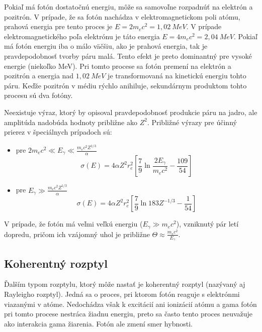 \documentclass[../../main.tex]{subfiles}
\begin{document}
Pokiaľ má fotón dostatočnú energiu, môže sa samovoľne rozpadnúť na elektrón a pozitrón. V prípade, že sa fotón nachádza v elektromagnetickom poli atómu, prahová energia pre tento proces je $E=2m_ec^2=1,02\:\unit{MeV}$. V prípade elektromagnetického poľa elektrónu je táto energia $E=4m_ec^2=2,04\:\unit{MeV}$. Pokiaľ má fotón energiu iba o málo väčšiu, ako je prahová energia, tak je pravdepodobnosť tvorby páru malá. Tento efekt je preto dominantný pre vysoké energie (niekoľko MeV). Pri tomto procese sa fotón premení na elektrón a pozitrón a energia nad $1,02\:\unit{MeV}$ je transformovaná na kinetickú energiu tohto páru. Keďže pozitrón v médiu rýchlo anihiluje, sekundárnym produktom tohto procesu sú dva fotóny.

Neexistuje výraz, ktorý by opisoval pravdepodobnosť produkcie páru na jadro, ale amplitúda nadobúda hodnoty približne ako $Z^2$. Približné výrazy pre účinný prierez v špeciálnych prípadoch sú:
\begin{itemize}
\item pre $2m_ec^2\ll E_\gamma \ll \frac{m_ec^2Z^{1/3}}{\alpha}$
\begin{equation}
\sigma(E)=4\alpha Z^2r_e^2\left[\dfrac{7}{9}\ln\dfrac{2E_\gamma}{m_ec^2}-\dfrac{109}{54}\right]
\end{equation}
\item pre $E_\gamma \gg \frac{m_ec^2Z^{1/3}}{\alpha}$
\begin{equation}
\sigma(E)=4\alpha Z^2r_e^2\left[\dfrac{7}{9}\ln183Z^{-1/3}-\dfrac{1}{54}\right]
\end{equation}
\end{itemize}
V prípade, že fotón má veľmi veľkú energiu ($E_\gamma \gg m_ec^2$), vzniknutý pár letí dopredu, pričom ich vzájomný uhol je približne $\Theta\approx  \frac{m_ec^2}{E_\gamma}$.

\subsection{Koherentný rozptyl}
Ďalším typom rozptylu, ktorý môže nastať je koherentný rozptyl (nazývaný aj Rayleigho rozptyl). Jedná sa o proces, pri ktorom fotón reaguje s elektrónmi viazanými v atóme. Nedochádza však k excitácií ani ionizácií atómu a gama fotón pri tomto procese nestráca žiadnu energiu, preto sa často tento proces neuvažuje ako interakcia gama žiarenia. Fotón ale zmení smer hybnosti. 
\end{document}
